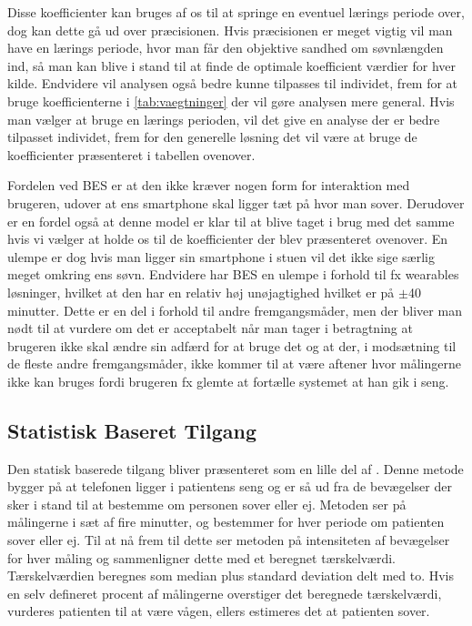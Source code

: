 Disse koefficienter kan bruges af os til at springe en eventuel lærings periode over, dog kan dette gå ud over præcisionen.
Hvis præcisionen er meget vigtig vil man have en lærings periode, hvor man får den objektive sandhed om søvnlængden ind, så man kan blive i stand til at finde de optimale koefficient værdier for hver kilde.
Endvidere vil analysen også bedre kunne tilpasses til individet, frem for at bruge koefficienterne i \cref{tab:vaegtninger} der vil gøre analysen mere general.
Hvis man vælger at bruge en lærings perioden, vil det give en analyse der er bedre tilpasset individet, frem for den generelle løsning det vil være at bruge de koefficienter præsenteret i tabellen ovenover.

Fordelen ved BES er at den ikke kræver nogen form for interaktion med brugeren, udover at ens smartphone skal ligger tæt på hvor man sover.
Derudover er en fordel også at denne model er klar til at blive taget i brug med det samme hvis vi vælger at holde os til de koefficienter der blev præsenteret ovenover.
En ulempe er dog hvis man ligger sin smartphone i stuen vil det ikke sige særlig meget omkring ens søvn.
Endvidere har BES en ulempe i forhold til fx wearables løsninger, hvilket at den har en relativ høj unøjagtighed hvilket er på $\pm$40 minutter. 
Dette er en del i forhold til andre fremgangsmåder, men der bliver man nødt til at vurdere om det er acceptabelt når man tager i betragtning at brugeren ikke skal ændre sin adfærd for at bruge det og at der, i modsætning til de fleste andre fremgangsmåder, ikke kommer til at være aftener hvor målingerne ikke kan bruges fordi brugeren fx glemte at fortælle systemet at han gik i seng.

\subsection{Statistisk Baseret Tilgang}\label{sec:statbased}
Den statisk baserede tilgang bliver præsenteret som en lille del af \citet{misc:statbased}.
Denne metode bygger på at telefonen ligger i patientens seng og er så ud fra de bevægelser der sker i stand til at bestemme om personen sover eller ej.
Metoden ser på målingerne i sæt af fire minutter, og bestemmer for hver periode om patienten sover eller ej.
Til at nå frem til dette ser metoden på intensiteten af bevægelser for hver måling og sammenligner dette med et beregnet tærskelværdi.
Tærskelværdien beregnes som median plus standard deviation delt med to.
Hvis en selv defineret procent af målingerne overstiger det beregnede tærskelværdi, vurderes patienten til at være vågen, ellers estimeres det at patienten sover.